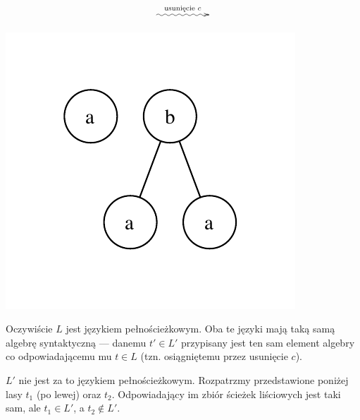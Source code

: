 \begin{przyklad}
\begin{center}
\begin{minipage}[t]{.25\linewidth}
		\end{minipage}
		\begin{minipage}[t]{.25\linewidth}
			\centering 
			\vspace{40pt}
			\begin{displaymath}
				\xymatrix{ 
					\ar@{~>}[rr]^{\textrm{usunięcie $c$}} &&
				}
			\end{displaymath}
		\end{minipage}
		\begin{minipage}[t]{.25\linewidth}
			\vspace{0pt}
			\centering
			\includegraphics[scale=0.6]{rysunki/w12-usuniecie_c_2.pdf}
		\end{minipage}
	\end{center}

	Oczywiście $L$ jest językiem pełnościeżkowym. Oba te języki mają taką samą algebrę syntaktyczną --- danemu $t' \in L'$ przypisany jest ten sam element algebry co odpowiadającemu mu $t \in L$ (tzn. osiągniętemu przez usunięcie $c$).

	$L'$ nie jest za to językiem pełnościeżkowym. Rozpatrzmy przedstawione poniżej lasy $t_1$ (po lewej) oraz $t_2$. Odpowiadający im zbiór ścieżek liściowych jest taki sam, ale $t_1 \in L'$, a $t_2 \notin L'$.


\end{przyklad}
